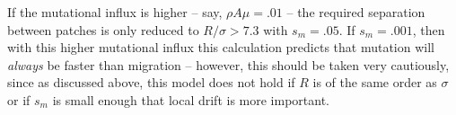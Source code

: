\documentclass{article}
\newcommand{\migrate}{\lambda_\text{mig}}
\newcommand{\mutrate}{\lambda_\text{mut}}
\newcommand{\Tmig}{T_\text{mig}}
\newcommand{\Tmut}{T_\text{mut}}
\begin{document}
If the mutational influx is higher -- say, $\rho A \mu = .01$ --
the required separation between patches is only reduced to $R/\sigma > 7.3$ with $s_m=.05$.
If $s_m=.001$, then with this higher mutational influx this calculation predicts that mutation will \emph{always} be faster than migration
-- however, this should be taken very cautiously,
since as discussed above, this model does not hold if $R$ is of the same order as $\sigma$
or if $s_m$ is small enough that local drift is more important.

% 
\end{document}
